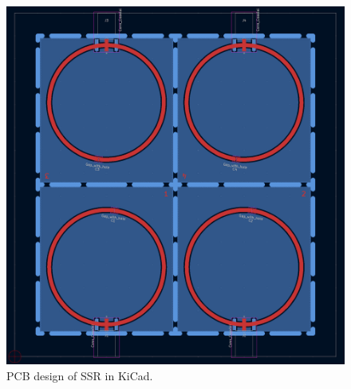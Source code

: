 \begin{figure}[h!]
	\centering
	\includegraphics[width=0.9\linewidth]{chapter_4/figures/SSR_CAD.png}
	\caption{PCB design of SSR in KiCad.}
	\label{fig:srr_cad}
\end{figure}

